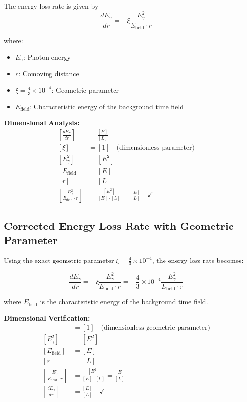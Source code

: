 \documentclass[12pt,a4paper]{report}
\begin{document}
	The energy loss rate is given by:
	\begin{equation}
		\frac{dE_\gamma}{dr} = -\xi \frac{E_\gamma^2}{E_{\text{field}} \cdot r}
		\label{eq:photon_energy_loss}
	\end{equation}
	
	where:
	\begin{itemize}
		\item $E_\gamma$: Photon energy
		\item $r$: Comoving distance
		\item $\xi = \frac{4}{3} \times 10^{-4}$: Geometric parameter
		\item $E_{\text{field}}$: Characteristic energy of the background time field
	\end{itemize}
	
	\textbf{Dimensional Analysis:}
	\begin{align}
		\left[\frac{dE_\gamma}{dr}\right] &= \frac{[E]}{[L]} \\
		[\xi] &= [1] \quad \text{(dimensionless parameter)} \\
		[E_\gamma^2] &= [E^2] \\
		[E_{\text{field}}] &= [E] \\
		[r] &= [L] \\
		\left[\frac{E_\gamma^2}{E_{\text{field}} \cdot r}\right] &= \frac{[E^2]}{[E] \cdot [L]} = \frac{[E]}{[L]} \quad \checkmark
	\end{align}	
\subsection{Corrected Energy Loss Rate with Geometric Parameter}
\label{subsec:corrected_energy_loss_rate}

Using the exact geometric parameter $\xi = \frac{4}{3} \times 10^{-4}$, the energy loss rate becomes:

\begin{equation}
	\boxed{\frac{dE_\gamma}{dr} = -\xi \frac{E_\gamma^2}{E_{\text{field}} \cdot r} = -\frac{4}{3} \times 10^{-4} \frac{E_\gamma^2}{E_{\text{field}} \cdot r}}
\end{equation}

where $E_{\text{field}}$ is the characteristic energy of the background time field.

\textbf{Dimensional Verification:}
\begin{align}
	[\xi] &= [1] \quad \text{(dimensionless geometric parameter)} \\
	[E_\gamma^2] &= [E^2] \\
	[E_{\text{field}}] &= [E] \\
	[r] &= [L] \\
	\left[\frac{E_\gamma^2}{E_{\text{field}} \cdot r}\right] &= \frac{[E^2]}{[E] \cdot [L]} = \frac{[E]}{[L]} \\
	\left[\frac{dE_\gamma}{dr}\right] &= \frac{[E]}{[L]} \quad \checkmark
\end{align}
	
\end{document}
